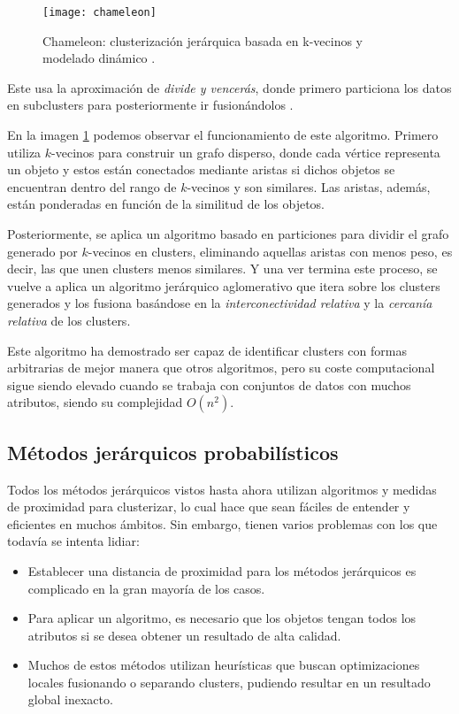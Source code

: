 \documentclass[10pt, a4paper]{article}
\begin{document}
\begin{figure}[ht]
\centering
\texttt{[image: chameleon]}
\caption{Chameleon: clusterización jerárquica basada en k-vecinos y modelado dinámico \cite{LIBRO}.}
\label{fig:chameleon}
\end{figure}

Este usa la aproximación de \textit{divide y vencerás}, donde primero particiona los datos en subclusters para posteriormente ir fusionándolos \cite{articulo14}.

En la imagen \ref{fig:chameleon} podemos observar el funcionamiento de este algoritmo. Primero utiliza $k$-vecinos para construir un grafo disperso, donde cada vértice representa un objeto y estos están conectados mediante aristas si dichos objetos se encuentran dentro del rango de $k$-vecinos y son similares. Las aristas, además, están ponderadas en función de la similitud de los objetos. 

Posteriormente, se aplica un algoritmo basado en particiones para dividir el grafo generado por $k$-vecinos en clusters, eliminando aquellas aristas con menos peso, es decir, las que unen clusters menos similares. Y una ver termina este proceso, se vuelve a aplica un algoritmo jerárquico aglomerativo que itera sobre los clusters generados y los fusiona basándose en la \textit{interconectividad relativa} y la \textit{cercanía relativa} de los clusters.

Este algoritmo ha demostrado ser capaz de identificar clusters con formas arbitrarias de mejor manera que otros algoritmos, pero su coste computacional sigue siendo elevado cuando se trabaja con conjuntos de datos con muchos atributos, siendo su complejidad $O\left(n^2\right)$.



\subsection{\textbf{Métodos jerárquicos probabilísticos}} \label{subsec:Métodos jerárquicos probabilísticos}

Todos los métodos jerárquicos vistos hasta ahora utilizan algoritmos y medidas de proximidad para clusterizar, lo cual hace que sean fáciles de entender y eficientes en muchos ámbitos. Sin embargo, tienen varios problemas con los que todavía se intenta lidiar:

\begin{itemize}
  \item Establecer una distancia de proximidad para los métodos jerárquicos es complicado en la gran mayoría de los casos.
  \item Para aplicar un algoritmo, es necesario que los objetos tengan todos los atributos si se desea obtener un resultado de alta calidad.
  \item Muchos de estos métodos utilizan heurísticas que buscan optimizaciones locales fusionando o separando clusters, pudiendo resultar en un resultado global inexacto.
\end{itemize}
\end{document}
